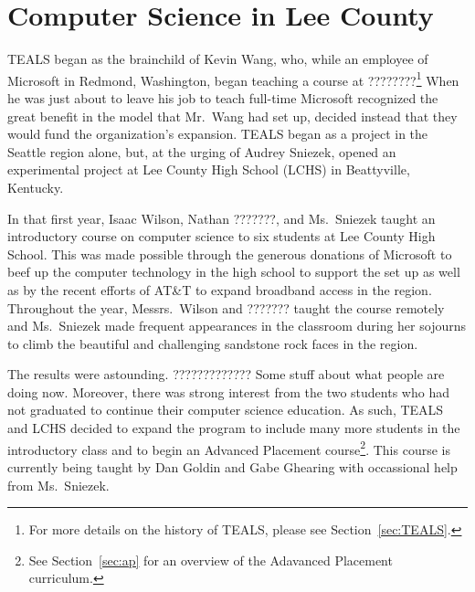 \newcommand{\nathanln}{???????}

\section{Computer Science in Lee County}\label{sec:CSInLee}

TEALS began as the brainchild of Kevin Wang, who, while an employee of Microsoft
in Redmond, Washington, began teaching a course at ????????\footnote{For more
details on the history of TEALS, please see Section~\ref{sec:TEALS}.} When he
was just about to leave his job to teach full-time Microsoft recognized the
great benefit in the model that Mr.~Wang had set up, decided instead that they
would fund the organization's expansion. TEALS began as a project in the Seattle
region alone, but, at the urging of Audrey Sniezek, opened an experimental
project at Lee County High School (LCHS) in Beattyville, Kentucky.

In that first year, Isaac Wilson, Nathan \nathanln{}, and Ms.~Sniezek taught an
introductory course on computer science to six students at Lee County High
School. This was made possible through the generous donations of Microsoft
to beef up the computer technology in the high school to support the
set up as well as by the recent efforts of AT\&T to expand broadband
access in the region\autocite{Something in which Hal Rogers is talking about Silicon
Holler}. Throughout the year, Messrs.~Wilson and \nathanln{} taught the course
remotely and Ms.~Sniezek made frequent appearances in the classroom during her
sojourns to climb the beautiful and challenging sandstone rock faces in the
region.

The results were astounding. ????????????? Some stuff about what people are
doing now. Moreover, there was strong interest from the two students who had
not graduated to continue their computer science education. As such, TEALS and
LCHS decided to expand the program to include many more students in the
introductory class and to begin an Advanced Placement course\footnote{See
Section~\ref{sec:ap} for an overview of the Adavanced Placement curriculum.}.
This course is currently being taught by Dan Goldin and Gabe Ghearing with
occassional help from Ms.~Sniezek.

